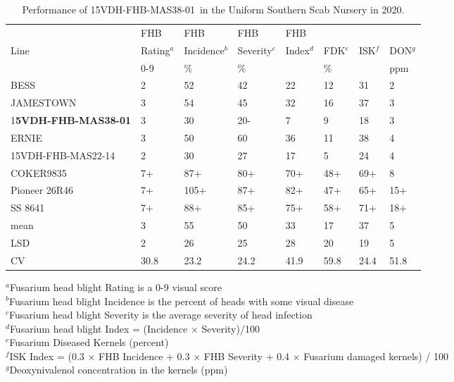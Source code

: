 \documentclass[12pt, letterpaper]{article}
\newcommand{\lin}{15VDH-FHB-MAS38-01~}
\begin{document}
\begin{landscape}
\begin{table}[ht]
\caption{Performance of \lin in the Uniform Southern Scab Nursery in 2020.}
\label{ussn20}
\begin{tabular}{llllllll}
  \hline
 & FHB & FHB & FHB & FHB &  &  &  \\ 
Line & Rating$^a$ & Incidence$^b$ & Severity$^c$ & Index$^d$ & FDK$^e$ & ISK$^f$ & DON$^g$ \\ 
 & 0-9 & \% & \% &  & \% &  & ppm \\ 
  \hline
BESS & 2 & 52 & 42 & 22 & 12 & 31 & 2 \\ 
  JAMESTOWN & 3 & 54 & 45 & 32 & 16 & 37 & 3 \\ 
  1\textbf{5VDH-FHB-MAS38-01} & 3 & 30 & 20- & 7 & 9 & 18 & 3 \\ 
  ERNIE & 3 & 50 & 60 & 36 & 11 & 38 & 4 \\ 
  15VDH-FHB-MAS22-14 & 2 & 30 & 27 & 17 & 5 & 24 & 4 \\ 
  COKER9835 & 7+ & 87+ & 80+ & 70+ & 48+ & 69+ & 8 \\ 
  Pioneer 26R46 & 7+ & 105+ & 87+ & 82+ & 47+ & 65+ & 15+ \\ 
  SS 8641 & 7+ & 88+ & 85+ & 75+ & 58+ & 71+ & 18+ \\ 
   \hline
  mean & 3 & 55 & 50 & 33 & 17 & 37 & 5 \\ 
  LSD & 2 & 26 & 25 & 28 & 20 & 19 & 5 \\ 
  CV & 30.8 & 23.2 & 24.2 & 41.9 & 59.8 & 24.4 & 51.8 \\ 
   \hline
\end{tabular}

\raggedright{
\footnotesize
$^a$Fusarium head blight Rating is a 0-9 visual score  \\
$^b$Fusarium head blight Incidence is the percent of heads with some visual disease \\
$^c$Fusarium head blight Severity is the average severity of head infection  \\
$^d$Fusarium head blight Index = (Incidence $\times$ Severity)/100 \\
$^e$Fusarium Diseased Kernels (percent) \\
$^f$ISK Index = (0.3 $\times$ FHB Incidence + 0.3 $\times$ FHB Severity + 0.4 $\times$ Fusarium damaged kernels) / 100\\
$^g$Deoxynivalenol concentration in the kernels (ppm)\\
}
\end{table}



\end{landscape}
\end{document}
